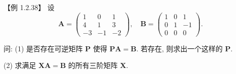 \documentclass[../../main.tex]{subfiles}%
\begin{document}
\begin{example}
【例 1.2.38】 设
\[
\boldsymbol{A} = \begin{pmatrix} 
1 & 0 & 1 \\
4 & 1 & 3 \\
-3 & -1 & -2 
\end{pmatrix}, \quad \boldsymbol{B} = \begin{pmatrix} 
1 & 0 & 1 \\
0 & 1 & -1 \\
0 & 0 & 0 
\end{pmatrix}.
\]

问: (1) 是否存在可逆矩阵 $\boldsymbol{P}$ 使得 $\boldsymbol{PA} = \boldsymbol{B}$. 若存在, 则求出一个这样的 $\boldsymbol{P}$.

(2) 求满足 $\boldsymbol{XA} = \boldsymbol{B}$ 的所有三阶矩阵 $\boldsymbol{X}$.
\end{example}
\end{document}
